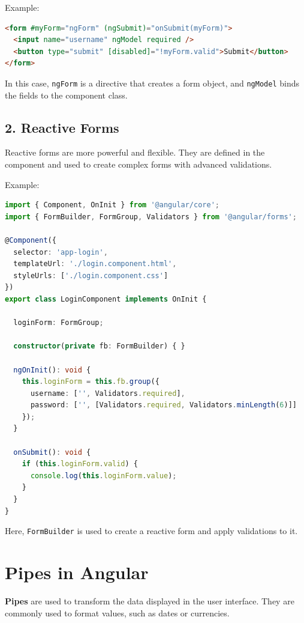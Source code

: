 \documentclass{article}
\begin{document}
Example:
\begin{lstlisting}[language=HTML, caption={Template-Driven Form Example}, label={lst:template-driven-form}]
<form #myForm="ngForm" (ngSubmit)="onSubmit(myForm)">
  <input name="username" ngModel required />
  <button type="submit" [disabled]="!myForm.valid">Submit</button>
</form>
\end{lstlisting}

In this case, \texttt{ngForm} is a directive that creates a form object, and \texttt{ngModel} binds the fields to the component class.

\subsection*{2. Reactive Forms}

Reactive forms are more powerful and flexible. They are defined in the component and used to create complex forms with advanced validations.

Example:
\begin{lstlisting}[language=TypeScript, caption={Reactive Form Example}, label={lst:reactive-form}]
import { Component, OnInit } from '@angular/core';
import { FormBuilder, FormGroup, Validators } from '@angular/forms';

@Component({
  selector: 'app-login',
  templateUrl: './login.component.html',
  styleUrls: ['./login.component.css']
})
export class LoginComponent implements OnInit {

  loginForm: FormGroup;

  constructor(private fb: FormBuilder) { }

  ngOnInit(): void {
    this.loginForm = this.fb.group({
      username: ['', Validators.required],
      password: ['', [Validators.required, Validators.minLength(6)]]
    });
  }

  onSubmit(): void {
    if (this.loginForm.valid) {
      console.log(this.loginForm.value);
    }
  }
}
\end{lstlisting}

Here, \texttt{FormBuilder} is used to create a reactive form and apply validations to it.

\section*{Pipes in Angular}

\textbf{Pipes} are used to transform the data displayed in the user interface. They are commonly used to format values, such as dates or currencies.
\end{document}
